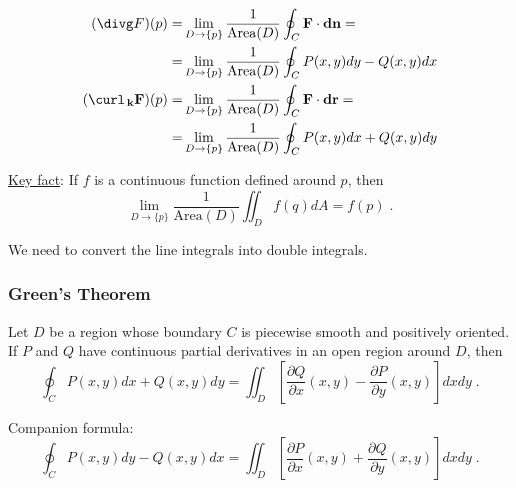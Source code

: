 \begin{frame}
  \frametitle{}

\begin{align*}
  (\divg F )(p) = & \lim_{D\to \{p\}} \frac{1}{\text{Area}(D)} \oint_C \textbf{F} \cdot \textbf{dn} = \\ = & \lim_{D\to \{p\}} \frac{1}{\text{Area}(D)} \oint_C P(x,y) dy - Q(x,y) dx \\
  (\curl_{\,\textbf{k}} \textbf{F})(p)= & \lim_{D\to \{p\}} \frac{1}{\text{Area}(D)} \oint_C \textbf{F} \cdot \textbf{dr} = \\ = & \lim_{D\to \{p\}} \frac{1}{\text{Area}(D)} \oint_C P(x,y) dx + Q(x,y) dy
\end{align*}

\pause \underline{Key fact}: If $f$ is a continuous function defined around $p$, then
%
$$\lim_{D \to \{p\}} \frac{1}{\text{Area}(D)} \iint_{D} f(q) dA = f(p)\; .$$

\pause We need to convert the line integrals into double integrals.
\end{frame}

\begin{frame}
  \frametitle{\textcolor[rgb]{0.00,1.00,0.00}{Green's Theorem}}

\begin{theorem}[Green]
  {\rm Let $D$ be a region whose boundary $C$ is piecewise smooth and positively oriented. If $P$ and $Q$ have continuous partial derivatives in an open region around $D$, then}
  $$
    \oint_C P(x,y) dx + Q(x,y) dy = \iint_D \left[\frac{\partial Q}{\partial x}(x,y) - \frac{\partial P}{\partial y}(x,y) \right] dxdy \; .
  $$
\end{theorem}
%
Companion formula:
%
  $$
    \oint_C P(x,y) dy - Q(x,y) dx = \iint_D \left[\frac{\partial P}{\partial x}(x,y) + \frac{\partial Q}{\partial y}(x,y) \right] dxdy \; .
  $$
\end{frame}

